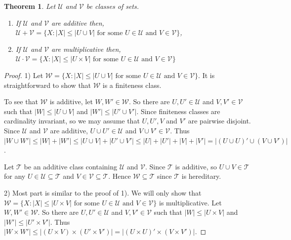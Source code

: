 \documentclass{amsart}
\renewcommand{\leq}{\leqslant}
\newcommand{\1}{\ensuremath{\mathds{1}}}
\theoremstyle{plain}
\newtheorem{thm}{Theorem}[section]
\theoremstyle{boldrk}
\theoremstyle{definition}
\begin{document}
\begin{thm} Let $\mathcal{U}$ and $\mathcal{V}$ be classes of sets.
\begin{enumerate}
    \item If $\mathcal{U}$ and $\mathcal{V}$ are additive then,
    \\ $\mathcal{U}+\mathcal{V}=\{X:|X|\leq|U\cup V|\text{ for some }U\in\mathcal{U}\text{ and }V\in\mathcal{V}\}$,
    \item If $\mathcal{U}$ and $\mathcal{V}$ are multiplicative then,
    \\ $\mathcal{U}\cdot\mathcal{V}=\{X:|X|\leq|U\times V|\text{ for some }U\in\mathcal{U}\text{ and }V\in\mathcal{V}\}$
\end{enumerate}
\end{thm}

\begin{proof}1) Let $\mathcal{W}=\{X:|X|\leq|U\cup V|\text{ for some }U\in\mathcal{U}\text{ and }V\in\mathcal{V}\}$. It is straightforward to show that $\mathcal{W}$ is a finiteness class. 

To see that $\mathcal{W}$ is additive, let $W,W'\in\mathcal{W}$. So there are $U,U'\in\mathcal{U}$ and $V,V'\in\mathcal{V}$ such that $|W|\leq |U\cup V|$ and $|W'|\leq |U'\cup V'|$. Since finiteness classes are cardinality invariant, so we may assume that $U, U', V $ and $V'$ are pairwise disjoint. Since $\mathcal{U}$ and $\mathcal{V}$ are additive, $U\cup U'\in\mathcal{U}$ and $V\cup V'\in\mathcal{V}$. Thus $|W\cup W'|\leq |W|+|W'|\leq |U\cup V|+|U'\cup V'|\leq|U|+|U'|+|V|+|V'|=|(U\cup U)'\cup( V\cup V')|$.

Let $\mathcal{T}$ be an additive class containing $\mathcal{U}$ and $\mathcal{V}$. Since $\mathcal{T}$ is additive, so $U\cup V\in\mathcal{T}$ for any $U\in\mathcal{U}\subseteq\mathcal{T}$ and $V\in\mathcal{V}\subseteq\mathcal{T}$. Hence $\mathcal{W}\subseteq\mathcal{T}$ since $\mathcal{T}$ is hereditary.

2) Most part is similar to the proof of 1). We will only show that $\mathcal{W}=\{X:|X|\leq|U\times V|\text{ for some }U\in\mathcal{U}\text{ and }V\in\mathcal{V}\}$ is multiplicative. Let $W,W'\in\mathcal{W}$. So there are $U,U'\in\mathcal{U}$ and $V,V'\in\mathcal{V}$ such that $|W|\leq |U\times V|$ and $|W'|\leq |U'\times V'|$. Thus $|W\times W'|\leq |(U\times V)\times(U'\times V')|=|(U\times U)'\times( V\times V')|$.
    
\end{proof}
\end{document}
